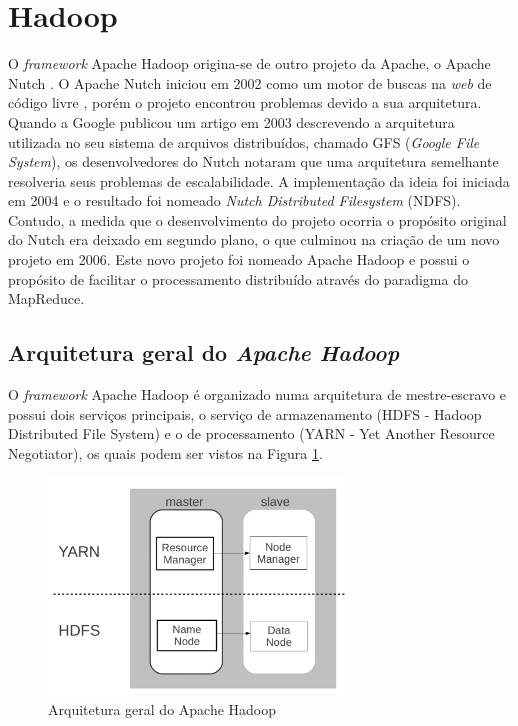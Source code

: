 
\section{Hadoop}
O \textit{framework} Apache Hadoop origina-se de outro projeto da Apache, o Apache Nutch \cite{Nutch}. O Apache Nutch iniciou em 2002 como um motor de buscas na \textit{web} de código livre , porém o projeto encontrou problemas devido a sua arquitetura. Quando a Google publicou um artigo em 2003 descrevendo a arquitetura utilizada no seu sistema de arquivos distribuídos, chamado GFS (\textit{Google File System}), os desenvolvedores do Nutch notaram que uma arquitetura semelhante resolveria seus problemas de escalabilidade. A implementação da ideia foi iniciada em 2004 e o resultado foi nomeado \textit{Nutch Distributed Filesystem} (NDFS). Contudo, a medida que o desenvolvimento do projeto ocorria o propósito original do Nutch era deixado em segundo plano, o que culminou na criação de um novo projeto em 2006. Este novo projeto foi nomeado Apache Hadoop e possui o propósito de facilitar o processamento distribuído através do paradigma do MapReduce.

\subsection{Arquitetura geral do \emph{Apache Hadoop}}
O \textit{framework} Apache Hadoop é organizado numa arquitetura de mestre-escravo e possui dois serviços principais, o serviço de armazenamento (HDFS - Hadoop Distributed File System) e o de processamento (YARN - Yet Another Resource Negotiator), os quais podem ser vistos na Figura \ref{fig:ArquiteturaHadoop}.

\begin{figure}[!ht]
\centering
\includegraphics[width=0.7\textwidth]{figuras/Figura08-HadoooArchGeral.png}
\caption{Arquitetura geral do Apache Hadoop}
\label{fig:ArquiteturaHadoop}
\end{figure}

